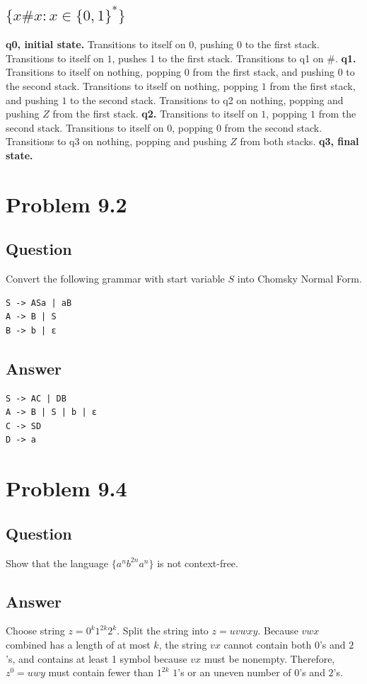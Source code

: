 \documentclass[12pt, a4paper]{article}
\begin{document}
\subsection{$\{x\#x : x \in \{0,1\}^{*} \}$}
\textbf{q0, initial state.} Transitions to itself on $0$, pushing $0$ to the first stack. Transitions to itself on $1$, pushes 1 to the first stack. Transitions to q1 on $\#$.\newline
\textbf{q1.} Transitions to itself on nothing, popping $0$ from the first stack, and pushing $0$ to the second stack. Transitions to itself on nothing, popping $1$ from the first stack, and pushing $1$ to the second stack. Transitions to q2 on nothing, popping and pushing $Z$ from the first stack.\newline
\textbf{q2.} Transitions to itself on $1$, popping $1$ from the second stack. Transitions to itself on $0$, popping $0$ from the second stack. Transitions to q3 on nothing, popping and pushing $Z$ from both stacks.\newline
\textbf{q3, final state.}

\section{Problem 9.2}
\subsection{Question}
Convert the following grammar with start variable $S$ into Chomsky Normal Form.
\begin{lstlisting}
S -> ASa | aB
A -> B | S
B -> b | ε
\end{lstlisting}
\subsection{Answer}
\begin{lstlisting}
S -> AC | DB
A -> B | S | b | ε
C -> SD
D -> a
\end{lstlisting}

\section{Problem 9.4}
\subsection{Question}
Show that the language $\{a^{n}b^{2n}a^{n}\}$ is not context-free.
\subsection{Answer}
Choose string $z=0^{k}1^{2k}2^{k}$. Split the string into $z=uvwxy$. Because $vwx$ combined has a length of at most $k$, the string $vx$ cannot contain both $0$'s and $2$'s, and contains at least 1 symbol because $vx$ must be nonempty. Therefore, $z^{0}=uwy$ must contain fewer than $1^{2k}$ $1$'s or an uneven number of $0$'s and $2$'s.
\end{document}
